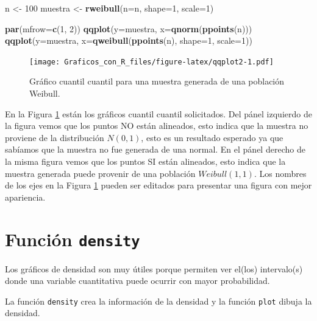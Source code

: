 \documentclass[10pt,]{krantz}
\makeatletter
\newenvironment{Shaded}{\begin{snugshade}}{\end{snugshade}}
\newcommand{\KeywordTok}[1]{\textcolor[rgb]{0.13,0.29,0.53}{\textbf{#1}}}
\newcommand{\DataTypeTok}[1]{\textcolor[rgb]{0.13,0.29,0.53}{#1}}
\newcommand{\DecValTok}[1]{\textcolor[rgb]{0.00,0.00,0.81}{#1}}
\newcommand{\StringTok}[1]{\textcolor[rgb]{0.31,0.60,0.02}{#1}}
\newcommand{\NormalTok}[1]{#1}
\newenvironment{kframe}{%
\medskip{}
\setlength{\fboxsep}{.8em}
 \def\at@end@of@kframe{}%
 \ifinner\ifhmode%
  \def\at@end@of@kframe{\end{minipage}}%
  \begin{minipage}{\columnwidth}%
 \fi\fi%
 \def\FrameCommand##1{\hskip\@totalleftmargin \hskip-\fboxsep
 \colorbox{shadecolor}{##1}\hskip-\fboxsep
     \hskip-\linewidth \hskip-\@totalleftmargin \hskip\columnwidth}%
 \MakeFramed {\advance\hsize-\width
   \@totalleftmargin\z@ \linewidth\hsize
   \@setminipage}}%
 {\par\unskip\endMakeFramed%
 \at@end@of@kframe}
\renewenvironment{Shaded}{\begin{kframe}}{\end{kframe}}
\makeatother
\begin{document}
\begin{Shaded}
\begin{Highlighting}[]
\NormalTok{n <-}\StringTok{ }\DecValTok{100}
\NormalTok{muestra <-}\StringTok{ }\KeywordTok{rweibull}\NormalTok{(}\DataTypeTok{n=}\NormalTok{n, }\DataTypeTok{shape=}\DecValTok{1}\NormalTok{, }\DataTypeTok{scale=}\DecValTok{1}\NormalTok{)}

\KeywordTok{par}\NormalTok{(}\DataTypeTok{mfrow=}\KeywordTok{c}\NormalTok{(}\DecValTok{1}\NormalTok{, }\DecValTok{2}\NormalTok{))}
\KeywordTok{qqplot}\NormalTok{(}\DataTypeTok{y=}\NormalTok{muestra, }\DataTypeTok{x=}\KeywordTok{qnorm}\NormalTok{(}\KeywordTok{ppoints}\NormalTok{(n)))}
\KeywordTok{qqplot}\NormalTok{(}\DataTypeTok{y=}\NormalTok{muestra, }\DataTypeTok{x=}\KeywordTok{qweibull}\NormalTok{(}\KeywordTok{ppoints}\NormalTok{(n), }\DataTypeTok{shape=}\DecValTok{1}\NormalTok{, }\DataTypeTok{scale=}\DecValTok{1}\NormalTok{))}
\end{Highlighting}
\end{Shaded}

\begin{figure}
\centering
\texttt{[image: Graficos\_con\_R\_files/figure-latex/qqplot2-1.pdf]}
\caption{\label{fig:qqplot2}Gráfico cuantil cuantil para una muestra
generada de una población Weibull.}
\end{figure}

En la Figura \ref{fig:qqplot2} están los gráficos cuantil cuantil
solicitados. Del pánel izquierdo de la figura vemos que los puntos NO
están alineados, esto indica que la muestra no proviene de la
distribución \(N(0, 1)\), esto es un resultado esperado ya que sabíamos
que la muestra no fue generada de una normal. En el pánel derecho de la
misma figura vemos que los puntos SI están alineados, esto indica que la
muestra generada puede provenir de una población \(Weibull(1, 1)\). Los
nombres de los ejes en la Figura \ref{fig:qqplot2} pueden ser editados
para presentar una figura con mejor apariencia.

\section{\texorpdfstring{Función \texttt{density} 
}{Función density  }}\label{funcion-density}

Los gráficos de densidad son muy útiles porque permiten ver el(los)
intervalo(s) donde una variable cuantitativa puede ocurrir con mayor
probabilidad.

La función \texttt{density} crea la información de la densidad y la
función \texttt{plot} dibuja la densidad.
\end{document}
